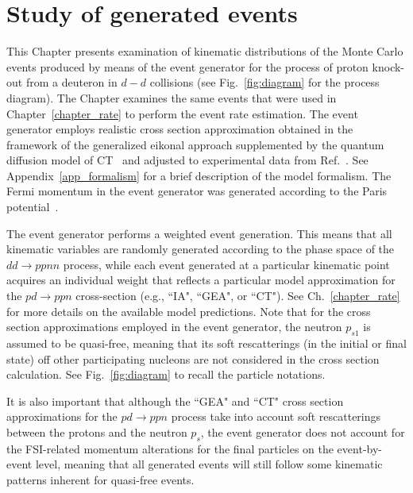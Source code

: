\newpage
\chapter{Study of generated events}
\mbox{}\vspace{-\baselineskip}
\label{chapter_generated}

This Chapter presents examination of kinematic distributions of the Monte Carlo events produced by means of the event generator for the process of proton knock-out from a deuteron in $d-d$ collisions (see Fig.~\ref{fig:diagram} for the process diagram). The Chapter examines the same events that were used in Chapter~\ref{chapter_rate} to perform the event rate estimation. The event generator employs realistic cross section approximation obtained in the framework of the generalized eikonal approach supplemented by the quantum diffusion model of CT~\cite{Frankfurt:1996uz,PhysRevC.107.014605,Larionov:2025equ,Farrar:1988me} and adjusted to experimental data from Ref.~\cite{Cocconi:1965zz}. See Appendix~\ref{app_formalism} for a brief description of the model formalism. The Fermi momentum in the event generator was generated according to the Paris potential~\cite{Lacombe:1981eg}.

The event generator performs a weighted event generation. This means that all kinematic variables are randomly generated according to the phase space of the $dd\rightarrow ppnn$ process, while each event generated at a particular kinematic point acquires an individual weight that reflects a particular model approximation for the $pd\rightarrow ppn$ cross-section (e.g., ``IA", ``GEA", or ``CT"). See Ch.~\ref{chapter_rate} for more details on the available model predictions. Note that for the cross section approximations employed in the event generator, the neutron $p_{s1}$ is assumed to be quasi-free, meaning that its soft rescatterings (in the initial or final state) off other participating nucleons are not considered in the cross section calculation. See Fig.~\ref{fig:diagram} to recall the particle notations. 





It is also important that although the ``GEA" and ``CT" cross section approximations for the $pd\rightarrow ppn$ process take into account soft rescatterings between the protons and the neutron $p_{s}$, the event generator does not account for the FSI-related momentum alterations for the final particles on the event-by-event level, meaning that all generated events will still follow some kinematic patterns inherent for quasi-free events.



